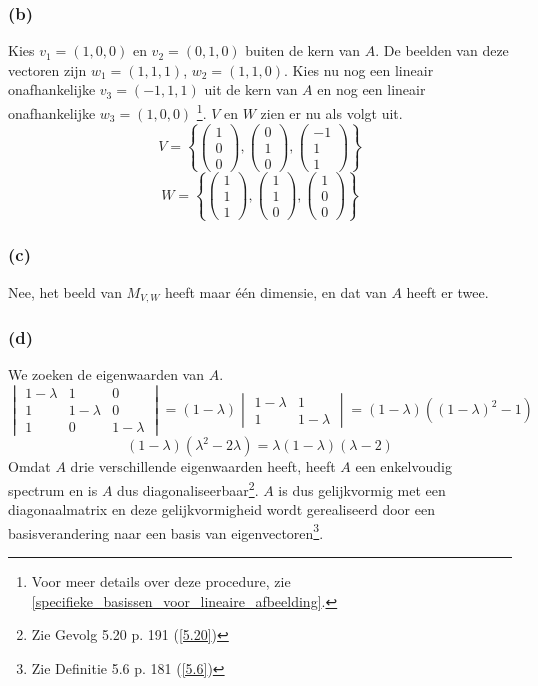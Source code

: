 \documentclass[lineaire_algebra_oplossingen.tex]{subfiles}
\begin{document}
\subsubsection*{(b)}
Kies $v_1 = (1,0,0)$ en $v_2 = (0,1,0)$ buiten de kern van $A$. De beelden van deze vectoren zijn $w_1=(1,1,1)$, $w_2=(1,1,0)$. Kies nu nog een lineair onafhankelijke $v_3=(-1,1,1)$ uit de kern van $A$ en nog een lineair onafhankelijke $w_3 = (1,0,0)$ \footnote{Voor meer details over deze procedure, zie \ref{specifieke_basissen_voor_lineaire_afbeelding}.}.
$V$ en $W$ zien er nu als volgt uit.
\[
V = 
\left\{
\begin{pmatrix}
1\\0\\0
\end{pmatrix}
,
\begin{pmatrix}
0\\1\\0
\end{pmatrix}
,
\begin{pmatrix}
-1\\1\\1
\end{pmatrix}
\right\}
\]
\[
W = 
\left\{
\begin{pmatrix}
1\\1\\1
\end{pmatrix}
,
\begin{pmatrix}
1\\1\\0
\end{pmatrix}
,
\begin{pmatrix}
1\\0\\0
\end{pmatrix}
\right\}
\]

\subsubsection*{(c)}
Nee, het beeld van $M_{V,W}$ heeft maar \'e\'en dimensie, en dat van $A$ heeft er twee.

\subsubsection*{(d)}
We zoeken de eigenwaarden van $A$.
\[
\begin{vmatrix}
1-\lambda & 1 & 0\\
1 & 1-\lambda & 0\\
1 & 0 & 1-\lambda
\end{vmatrix}
=
(1-\lambda)
\begin{vmatrix}
1-\lambda & 1\\
1 & 1-\lambda
\end{vmatrix}
=
(1-\lambda)((1-\lambda)^2-1)
\]
\[
(1-\lambda)(\lambda^2-2\lambda)
=
\lambda(1-\lambda)(\lambda-2)
\]
Omdat $A$ drie verschillende eigenwaarden heeft, heeft $A$ een enkelvoudig spectrum en is $A$ dus diagonaliseerbaar\footnote{Zie Gevolg 5.20 p. 191 (\ref{5.20})}. $A$ is dus gelijkvormig met een diagonaalmatrix en deze gelijkvormigheid wordt gerealiseerd door een basisverandering naar een basis van eigenvectoren\footnote{Zie Definitie 5.6 p. 181 (\ref{5.6})}.
\end{document}
